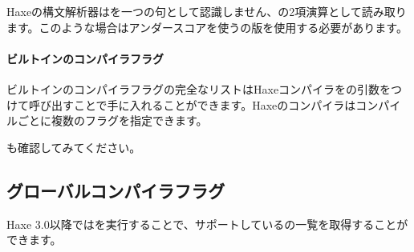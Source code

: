 Haxeの構文解析器はを一つの句として認識しません、の2項演算として読み取ります。このような場合はアンダースコアを使うの版を使用する必要があります。

\paragraph{ビルトインのコンパイラフラグ}

ビルトインのコンパイラフラグの完全なリストはHaxeコンパイラをの引数をつけて呼び出すことで手に入れることができます。Haxeのコンパイラはコンパイルごとに複数のフラグを指定できます。

も確認してみてください。

\subsection{グローバルコンパイラフラグ}
\label{lf-condition-compilation-flags}

Haxe 3.0以降ではを実行することで、サポートしているの一覧を取得することができます。

